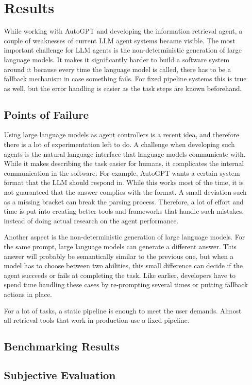 \documentclass[../main.tex]{subfiles}
\begin{document}
\chapter{Results}
\label{ch:results}

While working with AutoGPT and developing the information retrieval agent,
a couple of weaknesses of current LLM agent systems became visible.
The most important challenge for LLM agents is the non-deterministic generation of large language models.
It makes it significantly harder to build a software system around it because every time the language model is called,
there has to be a fallback mechanism in case something fails.
For fixed pipeline systems this is true as well,
but the error handling is easier as the task steps are known beforehand.

\section{Points of Failure}

Using large language models as agent controllers is a recent idea, and therefore there is a lot of experimentation left to do.
A challenge when developing such agents is the natural language interface that language models communicate with.
While it makes describing the task easier for humans, it complicates the internal communication in the software.
For example, AutoGPT wants a certain system format that the LLM should respond in.
While this works most of the time, it is not guaranteed that the answer complies with the format.
A small deviation such as a missing bracket can break the parsing process.
Therefore, a lot of effort and time is put into creating better tools and frameworks that handle such mistakes,
instead of doing actual research on the agent performance.

Another aspect is the non-deterministic generation of large language models. %
For the same prompt, large language models can generate a different answer.
This answer will probably be semantically similar to the previous one,
but when a model has to choose between two abilities,
this small difference can decide if the agent succeeds or fails at completing the task.
Like earlier, developers have to spend time handling these cases by re-prompting several times or putting fallback actions in place.

For a lot of tasks, a static pipeline is enough to meet the user demands.
Almost all retrieval tools that work in production use a fixed pipeline.

\section{Benchmarking Results}

\section{Subjective Evaluation}
\end{document}
